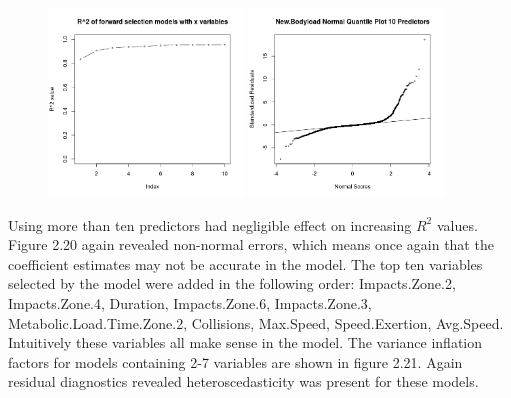 \begin{figure}[h]
	\centering
	\begin{minipage}{.45\textwidth}
		\centering
		\includegraphics[width=.9\linewidth, height=5cm]{Images/ForwardSelectionPlot.png}
	\end{minipage}%
	\hfill
	\begin{minipage}{.45\textwidth}
		\centering
		\includegraphics[width=.9\linewidth, height=5cm]{Images/QuantilePlot10Predictors.png}
	\end{minipage}
\end{figure}
\break
Using more than ten predictors had negligible effect on increasing $R^2$ values. Figure 2.20 again revealed non-normal errors, which means once again that the coefficient estimates may not be accurate in the model. The top ten variables selected by the model were added in the following order: Impacts.Zone.2, Impacts.Zone.4, Duration, Impacts.Zone.6, Impacts.Zone.3, Metabolic.Load.Time.Zone.2, Collisions, Max.Speed, Speed.Exertion, Avg.Speed. Intuitively these variables all make sense in the model. The variance inflation factors for models containing 2-7 variables are shown in figure 2.21. Again residual diagnostics revealed heteroscedasticity was present for these models. 
